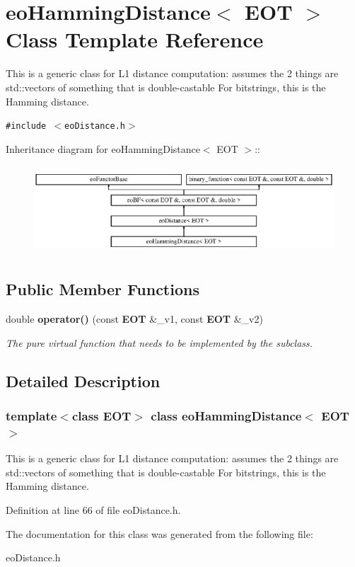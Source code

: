 \section{eo\-Hamming\-Distance$<$ EOT $>$ Class Template Reference}
\label{classeo_hamming_distance}
This is a generic class for L1 distance computation: assumes the 2 things are std::vectors of something that is double-castable For bitstrings, this is the Hamming distance.  


{\tt \#include $<$eo\-Distance.h$>$}

Inheritance diagram for eo\-Hamming\-Distance$<$ EOT $>$::\begin{figure}[H]
\begin{center}
\leavevmode
\includegraphics[height=3.33333cm]{classeo_hamming_distance}
\end{center}
\end{figure}
\subsection*{Public Member Functions}
\begin{CompactItemize}
\item 
double {\bf operator()} (const {\bf EOT} \&\_\-v1, const {\bf EOT} \&\_\-v2)\label{classeo_hamming_distance_a0}

\begin{CompactList}\small\item\em The pure virtual function that needs to be implemented by the subclass. \item\end{CompactList}\end{CompactItemize}


\subsection{Detailed Description}
\subsubsection*{template$<$class EOT$>$ class eo\-Hamming\-Distance$<$ EOT $>$}

This is a generic class for L1 distance computation: assumes the 2 things are std::vectors of something that is double-castable For bitstrings, this is the Hamming distance. 



Definition at line 66 of file eo\-Distance.h.

The documentation for this class was generated from the following file:\begin{CompactItemize}
\item 
eo\-Distance.h\end{CompactItemize}
